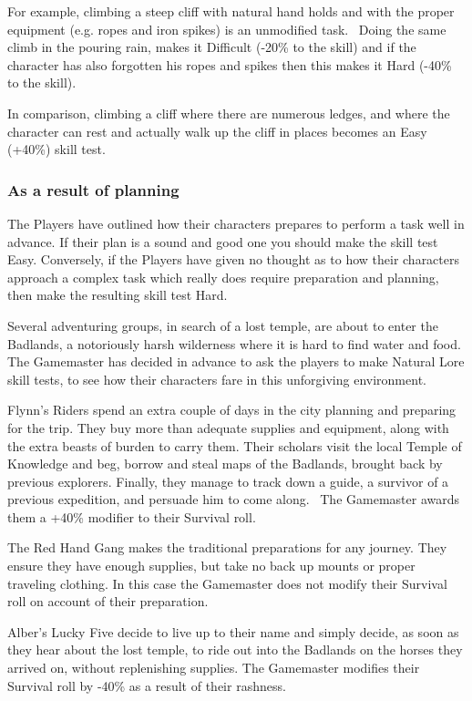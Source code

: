 For example, climbing a steep cliff with natural hand holds and with the proper equipment (e.g. ropes and iron spikes) is an unmodified task.  Doing the same climb in the pouring rain, makes it Difficult (-20\% to the skill) and if the character has also forgotten his ropes and spikes then this makes it Hard (-40\% to the skill).

In comparison, climbing a cliff where there are numerous ledges, and where the character can rest and actually walk up the cliff in places becomes an Easy (+40\%) skill test.


\subsubsection{As a result of planning}
The Players have outlined how their characters prepares to perform a task well in advance. If their plan is a sound and good one you should make the skill test Easy. Conversely, if the Players have given no thought as to how their characters approach a complex task which really does require preparation and planning, then make the resulting skill test Hard.

\begin{rpg-examplebox}
Several adventuring groups, in search of a lost temple, are about to enter the Badlands, a notoriously harsh wilderness where it is hard to find water and food. The Gamemaster has decided in advance to ask the players to make Natural Lore skill tests, to see how their characters fare in this unforgiving environment.

Flynn’s Riders spend an extra couple of days in the city planning and preparing for the trip. They buy more than adequate supplies and equipment, along with the extra beasts of burden to carry them. Their scholars visit the local Temple of Knowledge and beg, borrow and steal maps of the Badlands, brought back by previous explorers. Finally, they manage to track down a guide, a survivor of a previous expedition, and persuade him to come along.  The Gamemaster awards them a +40\% modifier to their Survival roll.

The Red Hand Gang makes the traditional preparations for any journey. They ensure they have enough supplies, but take no back up mounts or proper traveling clothing. In this case the Gamemaster does not modify their Survival roll on account of their preparation.

Alber’s Lucky Five decide to live up to their name and simply decide, as soon as they hear about the lost temple, to ride out into the Badlands on the horses they arrived on, without replenishing supplies. The Gamemaster modifies their Survival roll by -40\% as a result of their rashness.
\end{rpg-examplebox}



